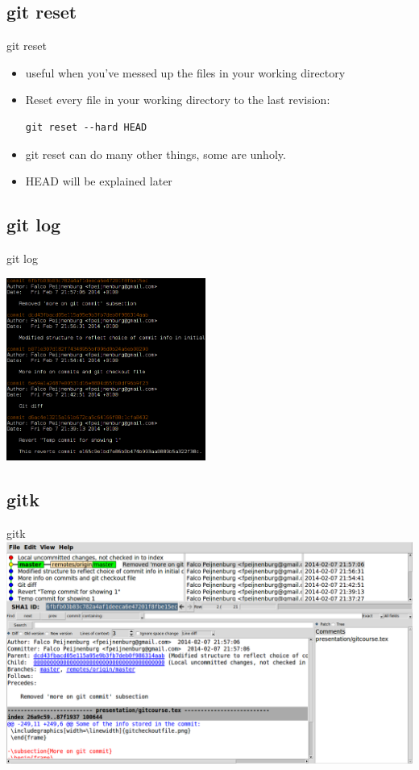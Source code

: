 \documentclass[10pt,a4paper]{beamer}
\begin{document}
\subsection{git reset}
\begin{frame}[fragile]{git reset}
\begin{itemize}
\item useful when you've messed up the files in your working directory
\item Reset every file in your working directory to the last revision:

\begin{verbatim}
git reset --hard HEAD
\end{verbatim}
\item git reset can do many other things, some are unholy.
\item HEAD will be explained later
\end{itemize}
\end{frame}

\subsection{git log}
\begin{frame}{git log}
\centerline{\includegraphics[height=6cm]{gitlog.png}}
\end{frame}

\subsection{gitk}
\begin{frame}{gitk}
\includegraphics[width=\linewidth]{gitk.png}
\end{frame}
\end{document}
